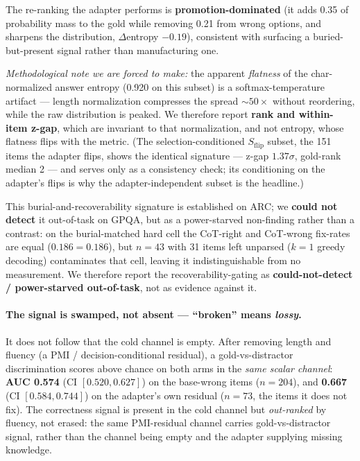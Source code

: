 The re-ranking the adapter performs is \textbf{promotion-dominated} (it adds 0.35 of
probability mass to the gold while removing 0.21 from wrong options, and sharpens
the distribution, $\Delta$entropy $-0.19$), consistent with surfacing a
buried-but-present signal rather than manufacturing one.

\emph{Methodological note we are forced to make:} the apparent \emph{flatness} of
the char-normalized answer entropy (0.920 on this subset) is a softmax-temperature
artifact --- length normalization compresses the spread ${\sim}50\times$ without
reordering, while the raw distribution is peaked. We therefore report \textbf{rank
and within-item z-gap}, which are invariant to that normalization, and not entropy,
whose flatness flips with the metric. (The selection-conditioned
$S_{\mathrm{flip}}$ subset, the 151 items the adapter flips, shows the identical
signature --- z-gap $1.37\sigma$, gold-rank median 2 --- and serves only as a
consistency check; its conditioning on the adapter's flips is why the
adapter-independent subset is the headline.)

This burial-and-recoverability signature is established on ARC; we \textbf{could not
detect} it out-of-task on GPQA, but as a power-starved non-finding rather than a
contrast: on the burial-matched hard cell the CoT-right and CoT-wrong fix-rates are
equal ($0.186 = 0.186$), but $n{=}43$ with 31 items left unparsed ($k{=}1$ greedy
decoding) contaminates that cell, leaving it indistinguishable from no measurement.
We therefore report the recoverability-gating as \textbf{could-not-detect /
power-starved out-of-task}, not as evidence against it.

\paragraph{The signal is swamped, not absent --- ``broken'' means \emph{lossy}.}
It does not follow that the cold channel is empty. After removing length and fluency
(a PMI / decision-conditional residual), a gold-vs-distractor discrimination scores
above chance on both arms in the \emph{same scalar channel}: \textbf{AUC 0.574} (CI
$[0.520, 0.627]$) on the base-wrong items ($n{=}204$), and \textbf{0.667} (CI
$[0.584, 0.744]$) on the adapter's own residual ($n{=}73$, the items it does not
fix). The correctness signal is present in the cold channel but \emph{out-ranked} by
fluency, not erased: the same PMI-residual channel carries gold-vs-distractor
signal, rather than the channel being empty and the adapter supplying missing
knowledge.

